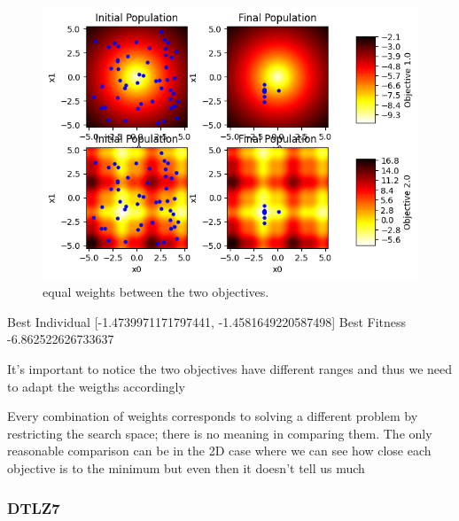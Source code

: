 \begin{figure}[H]
    \centering
    \includegraphics[width=\linewidth]{images/lab4/kursave_2D.png}
    \caption{equal weights between the two objectives.}
\end{figure}
Best Individual [-1.4739971171797441, -1.4581649220587498]
Best Fitness -6.862522626733637

It's important to notice the two objectives have different ranges and thus we need to adapt the weigths accordingly

Every combination of weights corresponds to solving a different problem by restricting the search space; there is no meaning in comparing them. The only reasonable comparison can be in the 2D case where we can see how close each objective is to the minimum but even then it doesn't tell us much
\subsubsection{DTLZ7}

